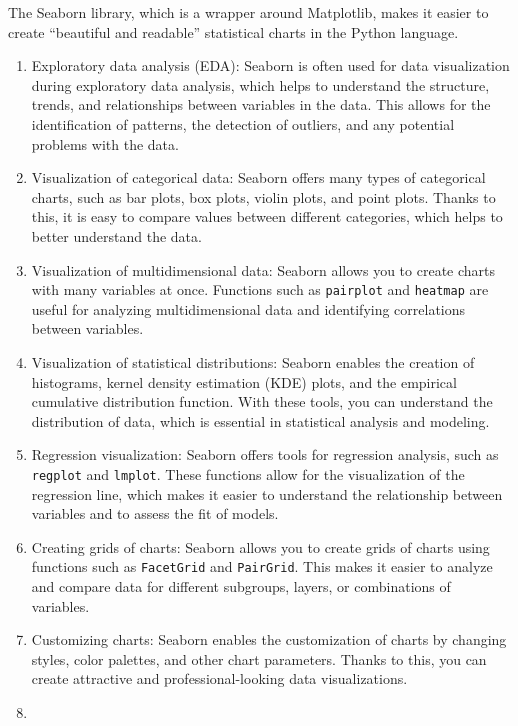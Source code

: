 \documentclass[
  english,
  letterpaper,
  DIV=11,
  numbers=noendperiod]{scrreprt}
\begin{document}
The Seaborn library, which is a wrapper around Matplotlib, makes it
easier to create ``beautiful and readable'' statistical charts in the
Python language.

\begin{enumerate}
\def\labelenumi{\arabic{enumi}.}
\item
  Exploratory data analysis (EDA): Seaborn is often used for data
  visualization during exploratory data analysis, which helps to
  understand the structure, trends, and relationships between variables
  in the data. This allows for the identification of patterns, the
  detection of outliers, and any potential problems with the data.
\item
  Visualization of categorical data: Seaborn offers many types of
  categorical charts, such as bar plots, box plots, violin plots, and
  point plots. Thanks to this, it is easy to compare values between
  different categories, which helps to better understand the data.
\item
  Visualization of multidimensional data: Seaborn allows you to create
  charts with many variables at once. Functions such as
  \texttt{pairplot} and \texttt{heatmap} are useful for analyzing
  multidimensional data and identifying correlations between variables.
\item
  Visualization of statistical distributions: Seaborn enables the
  creation of histograms, kernel density estimation (KDE) plots, and the
  empirical cumulative distribution function. With these tools, you can
  understand the distribution of data, which is essential in statistical
  analysis and modeling.
\item
  Regression visualization: Seaborn offers tools for regression
  analysis, such as \texttt{regplot} and \texttt{lmplot}. These
  functions allow for the visualization of the regression line, which
  makes it easier to understand the relationship between variables and
  to assess the fit of models.
\item
  Creating grids of charts: Seaborn allows you to create grids of charts
  using functions such as \texttt{FacetGrid} and \texttt{PairGrid}. This
  makes it easier to analyze and compare data for different subgroups,
  layers, or combinations of variables.
\item
  Customizing charts: Seaborn enables the customization of charts by
  changing styles, color palettes, and other chart parameters. Thanks to
  this, you can create attractive and professional-looking data
  visualizations.
\item

\end{enumerate}
\end{document}
